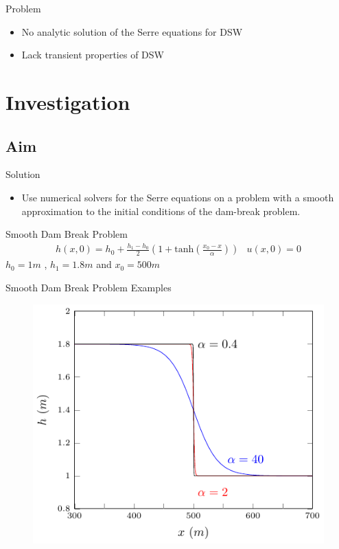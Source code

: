 \documentclass[pdf]{beamer}
\begin{document}
\begin{frame}{Problem}
	\begin{itemize}
		\item No analytic solution of the Serre equations for DSW
		\item Lack transient properties of DSW 
	\end{itemize}
\end{frame}

\section{Investigation}
\subsection{Aim}
\begin{frame}{Solution}
		\begin{itemize}
			\item 	Use numerical solvers for the Serre equations on a problem with a smooth approximation to the initial conditions of the dam-break problem.
		\end{itemize}
\end{frame}

\begin{frame}{Smooth Dam Break Problem}
	\begin{subequations}
		\begin{gather*}
		h(x,0) = h_0  + \frac{h_1 - h_0}{2} \left(1 + \text{tanh}\left(\frac{x_0 - x}{\alpha}\right)\right) 
		\end{gather*}
		\begin{gather*}
		u(x,0) = 0
		\end{gather*}
	\end{subequations} 
	\newline
	\centering
	$h_0 = 1m$ , $h_1 = 1.8m$ and $x_0 = 500m$
	
	
	
\end{frame}

\begin{frame}{Smooth Dam Break Problem Examples}
	\begin{figure}
		\includegraphics[width=0.7\linewidth]{./Pictures/DSW/DBSinit.pdf}
	\end{figure}	
	
\end{frame}
\end{document}
